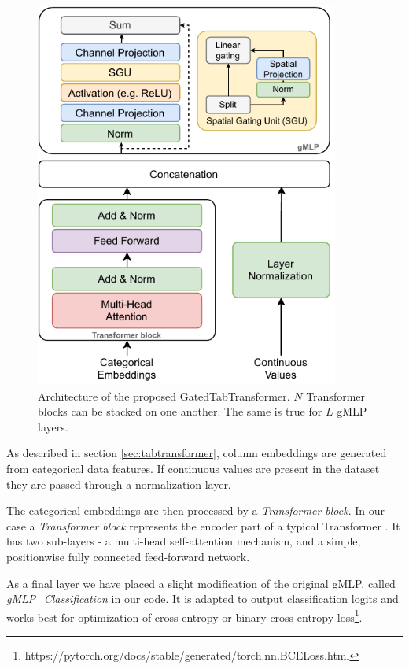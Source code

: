 \documentclass{article}
\begin{document}
\begin{figure}[hpt]
  \begin{center}
      \includegraphics[width=10cm]{GatedTabTransformer-architecture.pdf}
  \end{center}
  \caption{Architecture of the proposed GatedTabTransformer. $N$ Transformer blocks can be stacked on one another. The same is true for $L$ gMLP layers.}
  \label{fig:model}
\end{figure}

As described in section \ref{sec:tabtransformer}, column embeddings are generated from categorical data features. If continuous values are present in the dataset they are passed through a normalization layer.

The categorical embeddings are then processed by a \textit{Transformer block}. In our case a \textit{Transformer block} represents the encoder part of a typical Transformer \cite{vaswani2017attention}. It has two sub-layers -  a multi-head self-attention mechanism, and a simple, positionwise fully connected feed-forward network.

As a final layer we have placed a slight modification of the original gMLP, called \textit{gMLP\_Classification} in our code. It is adapted to output classification logits and works best for optimization of cross entropy or binary cross entropy loss\footnote{https://pytorch.org/docs/stable/generated/torch.nn.BCELoss.html}.
\end{document}

